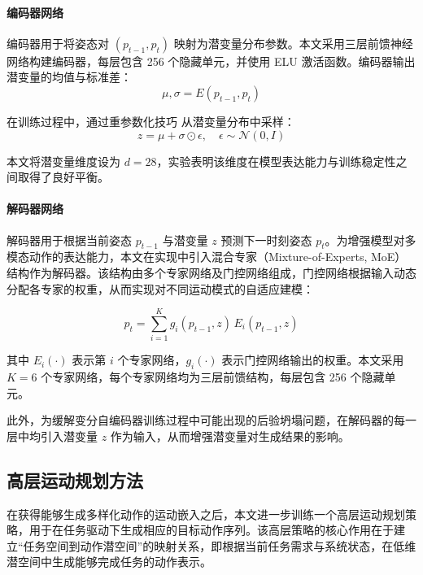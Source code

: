 \paragraph{编码器网络}

编码器用于将姿态对 $(p_{t-1}, p_t)$ 映射为潜变量分布参数。本文采用三层前馈神经网络构建编码器，每层包含 256 个隐藏单元，并使用 ELU 激活函数。编码器输出潜变量的均值与标准差：
\begin{equation}
	\mu, \sigma = E(p_{t-1}, p_t)
\end{equation}

在训练过程中，通过重参数化技巧 \cite{kingma2014adam} 从潜变量分布中采样：
\begin{equation}
	z = \mu + \sigma \odot \epsilon, \quad \epsilon \sim \mathcal{N}(0, I)
\end{equation}

本文将潜变量维度设为 $d=28$，实验表明该维度在模型表达能力与训练稳定性之间取得了良好平衡。

\paragraph{解码器网络}

解码器用于根据当前姿态 $p_{t-1}$ 与潜变量 $z$ 预测下一时刻姿态 $p_t$。为增强模型对多模态动作的表达能力，本文在实现中引入混合专家（Mixture-of-Experts, MoE）结构作为解码器。该结构由多个专家网络及门控网络组成，门控网络根据输入动态分配各专家的权重，从而实现对不同运动模式的自适应建模：

\begin{equation}
	p_t =
	\sum_{i=1}^{K}
	g_i(p_{t-1},z)\,
	E_i(p_{t-1},z)
\end{equation}

其中 $E_i(\cdot)$ 表示第 $i$ 个专家网络，$g_i(\cdot)$ 表示门控网络输出的权重。本文采用 $K=6$ 个专家网络，每个专家网络均为三层前馈结构，每层包含 256 个隐藏单元。

此外，为缓解变分自编码器训练过程中可能出现的后验坍塌问题，在解码器的每一层中均引入潜变量 $z$ 作为输入，从而增强潜变量对生成结果的影响。

\subsection{高层运动规划方法}

在获得能够生成多样化动作的运动嵌入之后，本文进一步训练一个高层运动规划策略，用于在任务驱动下生成相应的目标动作序列。该高层策略的核心作用在于建立“任务空间到动作潜空间”的映射关系，即根据当前任务需求与系统状态，在低维潜空间中生成能够完成任务的动作表示。

